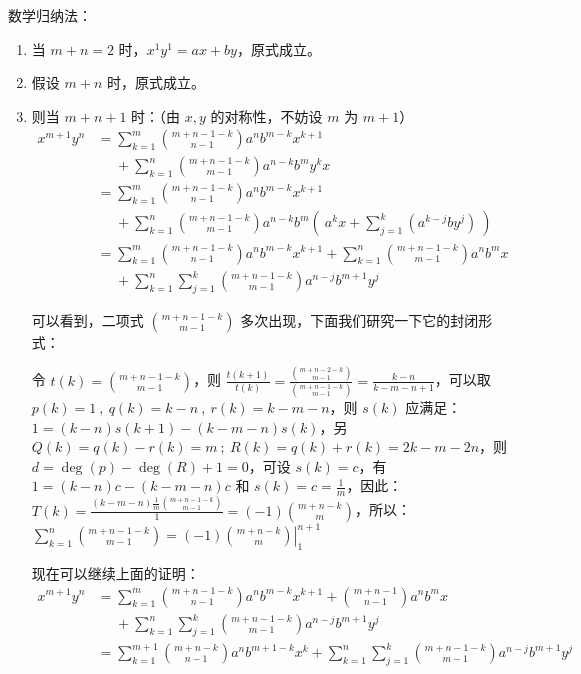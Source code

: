 数学归纳法：
\begin{enumerate}
  \item[1.] 当 \( m+n = 2 \) 时，\( x^1 y^1 = ax + by \)，原式成立。
  \item[2.] 假设 \( m+n \) 时，原式成立。
  \item[3.] 则当 \( m+n+1 \) 时：（由 \( x, y \) 的对称性，不妨设 \( m \) 为 \( m+1 \)）
    \begin{align*}
      x^{m+1} y^n &= \sum_{k=1}^m \binom{m+n-1-k}{n-1} a^n b^{m-k} x^{k+1} \\
      &\phantom{=} + \sum_{k=1}^n \binom{m+n-1-k}{m-1} a^{n-k} b^m y^k x \\
      &= \sum_{k=1}^m \binom{m+n-1-k}{n-1} a^n b^{m-k} x^{k+1} \\
      &\phantom{=} + \sum_{k=1}^n \binom{m+n-1-k}{m-1} a^{n-k} b^m ( \ a^k x + \sum_{j=1}^k (a^{k-j} b y^j) \ ) \\
      &= \sum_{k=1}^m \binom{m+n-1-k}{n-1} a^n b^{m-k} x^{k+1} + \sum_{k=1}^n \binom{m+n-1-k}{m-1} a^n b^m x \\
      &\phantom{=} + \sum_{k=1}^n \sum_{j=1}^k \binom{m+n-1-k}{m-1} a^{n-j} b^{m+1} y^j
    \end{align*}

    可以看到，二项式 \( \binom{m+n-1-k}{m-1} \) 多次出现，下面我们研究一下它的封闭形式：

    令 \( t(k) = \binom{m+n-1-k}{m-1} \)，则 \( \frac{t(k+1)}{t(k)} = \frac{\binom{m+n-2-k}{m-1}}{\binom{m+n-1-k}{m-1}} = \frac{k-n}{k-m-n+1} \)，可以取 \( p(k) = 1 \ , \ q(k) = k-n \ , \ r(k) = k-m-n \)，则 \( s(k) \) 应满足：\( 1 = (k - n) s(k+1) - (k-m-n) s(k) \)，另 \( Q(k) = q(k) - r(k) = m \ ; \ R(k) = q(k) + r(k) = 2k - m -2n \)，则 \( d = \deg{(p)} - \deg{(R)} + 1 = 0 \)，可设 \( s(k) = c \)，有 \( 1 = (k-n)c - (k-m-n)c \) 和 \( s(k) = c = \frac{1}{m} \)，因此：\( T(k) = \frac{(k-m-n) \frac{1}{m} \binom{m+n-1-k}{m-1}}{1} = (-1) \binom{m+n-k}{m} \)，所以：\( \sum_{k=1}^n \binom{m+n-1-k}{m-1} = (-1) \left. \binom{m+n-k}{m} \right|_1^{n+1} \)

    现在可以继续上面的证明：
    \begin{align*}
      x^{m+1} y^n &= \sum_{k=1}^m \binom{m+n-1-k}{n-1} a^n b^{m-k} x^{k+1} + \binom{m+n-1}{n-1} a^n b^m x \\
      &\phantom{=} + \sum_{k=1}^n \sum_{j=1}^k \binom{m+n-1-k}{m-1} a^{n-j} b^{m+1} y^j \\
      &= \sum_{k=1}^{m+1} \binom{m+n-k}{n-1} a^n b^{m+1-k} x^k + \sum_{k=1}^n \sum_{j=1}^k \binom{m+n-1-k}{m-1} a^{n-j} b^{m+1} y^j
    \end{align*}


\end{enumerate}
